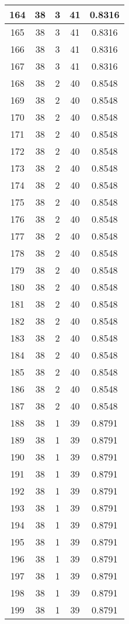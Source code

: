 \documentclass[letterpaper, 12pt]{article}
\begin{document}
\begin{longtable}{|c|c|c|c|c|}
\hline
164 & 38 & 3 & 41 & 0.8316 \\
\hline
165 & 38 & 3 & 41 & 0.8316 \\
\hline
166 & 38 & 3 & 41 & 0.8316 \\
\hline
167 & 38 & 3 & 41 & 0.8316 \\
\hline
168 & 38 & 2 & 40 & 0.8548 \\
\hline
169 & 38 & 2 & 40 & 0.8548 \\
\hline
170 & 38 & 2 & 40 & 0.8548 \\
\hline
171 & 38 & 2 & 40 & 0.8548 \\
\hline
172 & 38 & 2 & 40 & 0.8548 \\
\hline
173 & 38 & 2 & 40 & 0.8548 \\
\hline
174 & 38 & 2 & 40 & 0.8548 \\
\hline
175 & 38 & 2 & 40 & 0.8548 \\
\hline
176 & 38 & 2 & 40 & 0.8548 \\
\hline
177 & 38 & 2 & 40 & 0.8548 \\
\hline
178 & 38 & 2 & 40 & 0.8548 \\
\hline
179 & 38 & 2 & 40 & 0.8548 \\
\hline
180 & 38 & 2 & 40 & 0.8548 \\
\hline
181 & 38 & 2 & 40 & 0.8548 \\
\hline
182 & 38 & 2 & 40 & 0.8548 \\
\hline
183 & 38 & 2 & 40 & 0.8548 \\
\hline
184 & 38 & 2 & 40 & 0.8548 \\
\hline
185 & 38 & 2 & 40 & 0.8548 \\
\hline
186 & 38 & 2 & 40 & 0.8548 \\
\hline
187 & 38 & 2 & 40 & 0.8548 \\
\hline
188 & 38 & 1 & 39 & 0.8791 \\
\hline
189 & 38 & 1 & 39 & 0.8791 \\
\hline
190 & 38 & 1 & 39 & 0.8791 \\
\hline
191 & 38 & 1 & 39 & 0.8791 \\
\hline
192 & 38 & 1 & 39 & 0.8791 \\
\hline
193 & 38 & 1 & 39 & 0.8791 \\
\hline
194 & 38 & 1 & 39 & 0.8791 \\
\hline
195 & 38 & 1 & 39 & 0.8791 \\
\hline
196 & 38 & 1 & 39 & 0.8791 \\
\hline
197 & 38 & 1 & 39 & 0.8791 \\
\hline
198 & 38 & 1 & 39 & 0.8791 \\
\hline
199 & 38 & 1 & 39 & 0.8791 \\
\hline
\end{longtable}
\end{document}
